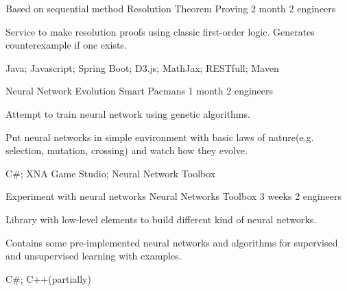 \begin{cventries}
  \cventry
    {Based on sequential method}
    {Resolution Theorem Proving}
    {2 month}
    {2 engineers}
    {
      \begin{cvitems}
        \item {Service to make resolution proofs using classic first-order logic. Generates counterexample if one exists.}
        \item {Java; Javascript; Spring Boot; D3.js; MathJax; RESTfull; Maven}
      \end{cvitems}
    }
  \cventry
    {Neural Network Evolution}
    {Smart Pacmans}
    {1 month}
    {2 engineers}
    {
      \begin{cvitems}
        \item {Attempt to train neural network using genetic algorithms.}
        \item {Put neural networks in simple environment with basic laws of nature(e.g. selection, mutation, crossing) and watch how they evolve.}
        \item {C\#; XNA Game Studio; Neural Network Toolbox}
      \end{cvitems} 
    }
  \cventry
    {Experiment with neural networks}
    {Neural Networks Toolbox}
    {3 weeks}
    {2 engineers}
    {
      \begin{cvitems}
        \item {Library with low-level elements to build different kind of neural networks.}
        \item {Contains some pre-implemented neural networks and algorithms for supervised and unsupervised learning with examples.}
        \item {C\#; C++(partially)}
      \end{cvitems}
    }
\end{cventries}
